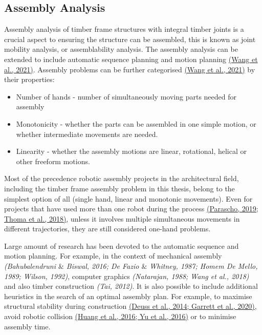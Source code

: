 \subsection{Assembly Analysis}

Assembly analysis of timber frame structures with integral timber joints is a crucial aspect to ensuring the structure can be assembled, this is known as joint mobility analysis, or assemblability analysis. The assembly analysis can be extended to include automatic sequence planning and motion planning \href{https://www.zotero.org/google-docs/?JFbpMZ}{(Wang et al., 2021)}. Assembly problems can be further categorised \href{https://www.zotero.org/google-docs/?Ioe45z}{(Wang et al., 2021)} by their properties: 

\begin{itemize}
	\item Number of hands - number of simultaneously moving parts needed for assembly 

	\item Monotonicity - whether the parts can be assembled in one simple motion, or whether intermediate movements are needed.

	\item Linearity - whether the assembly motions are linear, rotational, helical or other freeform motions. 

\end{itemize}
Most of the precedence robotic assembly projects in the architectural field, including the timber frame assembly problem in this thesis, belong to the simplest option of all (single hand, linear and monotonic movements). Even for projects that have used more than one robot during the process \href{https://www.zotero.org/google-docs/?4QpBeT}{(Parascho, 2019; Thoma et al., 2018)}, unless it involves multiple simultaneous movements in different trajectories, they are still considered one-hand problems.

\begin{flushleft}
Large amount of research has been devoted to the automatic sequence and motion planning. For example, in the context of mechanical assembly\textit{ \href{https://www.zotero.org/google-docs/?AdSBUO}{}(Bahubalendruni $\&$ Biswal, 2016; De Fazio $\&$ Whitney, 1987; Homem De Mello, 1989; Wilson, 1992)}, computer graphics\textit{ \href{https://www.zotero.org/google-docs/?drprl1}{}(Natarajan, 1988; Wang et al., 2018)} and also timber construction\textit{ \href{https://www.zotero.org/google-docs/?NZFd5k}{}(Tai, 2012)}. It is also possible to include additional heuristics in the search of an optimal assembly plan. For example, to maximise structural stability during construction \href{https://www.zotero.org/google-docs/?qq9t2G}{(Deuss et al., 2014; Garrett et al., 2020)}, avoid robotic collision \href{https://www.zotero.org/google-docs/?noNjLm}{(Huang et al., 2016; Yu et al., 2016)} or to minimise assembly time.
\end{flushleft}


